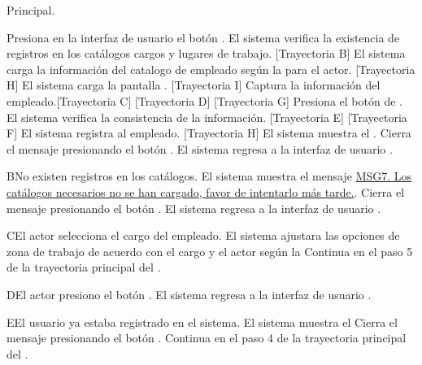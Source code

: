 \begin{UCtrayectoria}{Principal.}
    
  \UCpaso[\UCactor] Presiona en la interfaz de usuario  el botón \IUbutton{+}.
    \UCpaso  El sistema verifica la existencia de registros en los catálogos cargos  y  lugares de trabajo. [Trayectoria B] 
    \UCpaso El sistema carga la información del catalogo de empleado  según la  para el actor. [Trayectoria H]
    \UCpaso El sistema carga la pantalla  . [Trayectoria I]
    \UCpaso[\UCactor] Captura la información del empleado.[Trayectoria C] [Trayectoria D] [Trayectoria G]
    \UCpaso[\UCactor]  Presiona el botón de .
    \UCpaso El sistema verifica la consistencia de la información. [Trayectoria E] [Trayectoria F]
    \UCpaso El sistema registra al empleado. [Trayectoria H]
    \UCpaso  El sistema muestra el .    
    \UCpaso[\UCactor] Cierra el mensaje presionando el botón .
    \UCpaso El sistema regresa a la interfaz de usuario .
\end{UCtrayectoria}


\begin{UCtrayectoriaA}{B}{No existen registros en los catálogos.}
    \UCpaso El sistema muestra el mensaje \hyperref[MSG7]{MSG7. Los catálogos necesarios no se han cargado, favor de intentarlo más tarde.}.
	\UCpaso[\UCactor] Cierra el mensaje presionando el botón .
     \UCpaso El sistema regresa a la interfaz de usuario .
\end{UCtrayectoriaA}

\begin{UCtrayectoriaA}{C}{El actor selecciona el cargo del empleado.}
    \UCpaso     El sistema ajustara las opciones de zona de trabajo de acuerdo con el cargo y el actor según la 
    \UCpaso Continua en el paso 5 de la trayectoria principal del .
\end{UCtrayectoriaA}

\begin{UCtrayectoriaA}{D}{El actor presiono el botón .}
 \UCpaso El sistema regresa a la interfaz de usuario .
\end{UCtrayectoriaA}

\begin{UCtrayectoriaA}{E}{El usuario ya estaba registrado en el sistema.}
 \UCpaso El sistema muestra el  
 \UCpaso[\UCactor] Cierra el mensaje presionando el botón .
 \UCpaso Continua en el paso 4 de la trayectoria principal del .
\end{UCtrayectoriaA}

